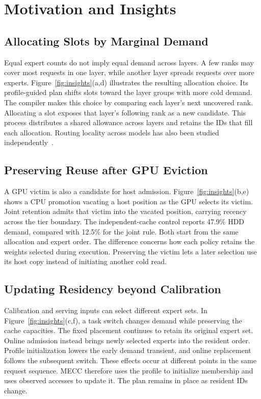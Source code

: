 \documentclass[conference,9pt,letterpaper]{IEEEtran}
\begin{document}
\section{Motivation and Insights}
\label{sec:challenges}
\subsection{Allocating Slots by Marginal Demand}
Equal expert counts do not imply equal demand across layers. A few ranks may cover most requests in one layer, while another layer spreads requests over more experts. Figure~\ref{fig:insights}(a,d) illustrates the resulting allocation choice. Its profile-guided plan shifts slots toward the layer groups with more cold demand. The compiler makes this choice by comparing each layer's next uncovered rank. Allocating a slot exposes that layer's following rank as a new candidate. This process distributes a shared allowance across layers and retains the IDs that fill each allocation. Routing locality across models has also been studied independently~\cite{routingconsistency}.

\subsection{Preserving Reuse after GPU Eviction}
A GPU victim is also a candidate for host admission. Figure~\ref{fig:insights}(b,e) shows a CPU promotion vacating a host position as the GPU selects its victim. Joint retention admits that victim into the vacated position, carrying recency across the tier boundary. The independent-cache control reports 47.9\% HDD demand, compared with 12.5\% for the joint rule. Both start from the same allocation and expert order. The difference concerns how each policy retains the weights selected during execution. Preserving the victim lets a later selection use its host copy instead of initiating another cold read.

\subsection{Updating Residency beyond Calibration}
Calibration and serving inputs can select different expert sets. In Figure~\ref{fig:insights}(c,f), a task switch changes demand while preserving the cache capacities. The fixed placement continues to retain its original expert set. Online admission instead brings newly selected experts into the resident order. Profile initialization lowers the early demand transient, and online replacement follows the subsequent switch. These effects occur at different points in the same request sequence. MECC therefore uses the profile to initialize membership and uses observed accesses to update it. The plan remains in place as resident IDs change.
\end{document}
